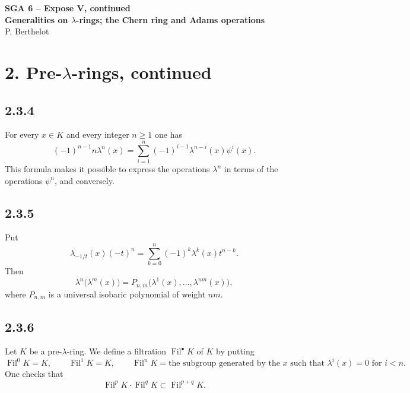 \documentclass[13pt]{extarticle}
\newcommand{\Fil}{\operatorname{Fil}}
\begin{document}
\begin{center}
{\Large\textbf{SGA 6 -- Expose V, continued}}\\[0.35em]
{\large\textbf{Generalities on $\lambda$-rings; the Chern ring and Adams operations}}\\[0.25em]
{\large P. Berthelot}
\end{center}

\section*{2. Pre-$\lambda$-rings, continued}

\subsection*{2.3.4}
For every $x\in K$ and every integer $n\geq 1$ one has
\begin{equation}\label{eq:2.3.4}
(-1)^{n-1}n\lambda^n(x)=\sum_{i=1}^{n}(-1)^{i-1}\lambda^{n-i}(x)\psi^i(x).
\end{equation}
This formula makes it possible to express the operations $\lambda^n$ in terms of the operations $\psi^n$, and conversely.

\subsection*{2.3.5}
Put
\begin{equation}\label{eq:2.3.5a}
\lambda_{-1/t}(x)(-t)^n=\sum_{k=0}^{n}(-1)^k\lambda^k(x)t^{n-k}.
\end{equation}
Then
\begin{equation}\label{eq:2.3.5b}
\lambda^n\bigl(\lambda^m(x)\bigr)=P_{n,m}\bigl(\lambda^1(x),\ldots,\lambda^{nm}(x)\bigr),
\end{equation}
where $P_{n,m}$ is a universal isobaric polynomial of weight $nm$.

\subsection*{2.3.6}
Let $K$ be a pre-$\lambda$-ring. We define a filtration $\Fil^\bullet K$ of $K$ by putting
\begin{equation}\label{eq:2.3.6}
\Fil^0K=K,
\qquad
\Fil^1K=K,
\qquad
\Fil^nK=\text{the subgroup generated by the }x\text{ such that }\lambda^i(x)=0\text{ for }i<n.
\end{equation}
One checks that
\[
\Fil^pK\cdot \Fil^qK\subset \Fil^{p+q}K.
\]
\end{document}
